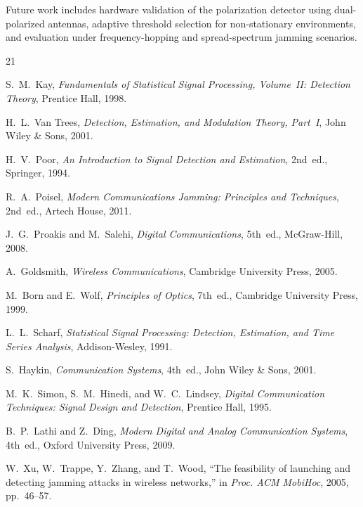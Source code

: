 \documentclass[conference]{IEEEtran}
\begin{document}
Future work includes hardware validation of the polarization detector using dual-polarized antennas, adaptive threshold selection for non-stationary environments, and evaluation under frequency-hopping and spread-spectrum jamming scenarios.


\begin{thebibliography}{21}

S.~M.~Kay, \textit{Fundamentals of Statistical Signal Processing, Volume~II: Detection Theory}, Prentice Hall, 1998.

H.~L.~Van Trees, \textit{Detection, Estimation, and Modulation Theory, Part~I}, John Wiley \& Sons, 2001.

H.~V.~Poor, \textit{An Introduction to Signal Detection and Estimation}, 2nd~ed., Springer, 1994.

R.~A.~Poisel, \textit{Modern Communications Jamming: Principles and Techniques}, 2nd~ed., Artech House, 2011.

J.~G.~Proakis and M.~Salehi, \textit{Digital Communications}, 5th~ed., McGraw-Hill, 2008.

A.~Goldsmith, \textit{Wireless Communications}, Cambridge University Press, 2005.

M.~Born and E.~Wolf, \textit{Principles of Optics}, 7th~ed., Cambridge University Press, 1999.

L.~L.~Scharf, \textit{Statistical Signal Processing: Detection, Estimation, and Time Series Analysis}, Addison-Wesley, 1991.

S.~Haykin, \textit{Communication Systems}, 4th~ed., John Wiley \& Sons, 2001.

M.~K.~Simon, S.~M.~Hinedi, and W.~C.~Lindsey, \textit{Digital Communication Techniques: Signal Design and Detection}, Prentice Hall, 1995.

B.~P.~Lathi and Z.~Ding, \textit{Modern Digital and Analog Communication Systems}, 4th~ed., Oxford University Press, 2009.

W.~Xu, W.~Trappe, Y.~Zhang, and T.~Wood, ``The feasibility of launching and detecting jamming attacks in wireless networks,'' in \textit{Proc. ACM MobiHoc}, 2005, pp.~46--57.


\end{thebibliography}
\end{document}
